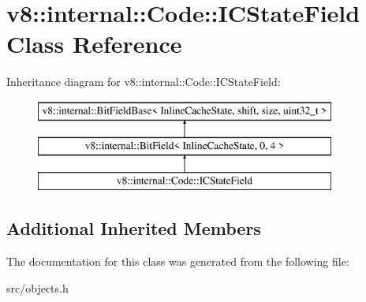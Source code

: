 \hypertarget{classv8_1_1internal_1_1_code_1_1_i_c_state_field}{}\section{v8\+:\+:internal\+:\+:Code\+:\+:I\+C\+State\+Field Class Reference}
\label{classv8_1_1internal_1_1_code_1_1_i_c_state_field}
Inheritance diagram for v8\+:\+:internal\+:\+:Code\+:\+:I\+C\+State\+Field\+:\begin{figure}[H]
\begin{center}
\leavevmode
\includegraphics[height=3.000000cm]{classv8_1_1internal_1_1_code_1_1_i_c_state_field}
\end{center}
\end{figure}
\subsection*{Additional Inherited Members}


The documentation for this class was generated from the following file\+:\begin{DoxyCompactItemize}
\item 
src/objects.\+h\end{DoxyCompactItemize}
